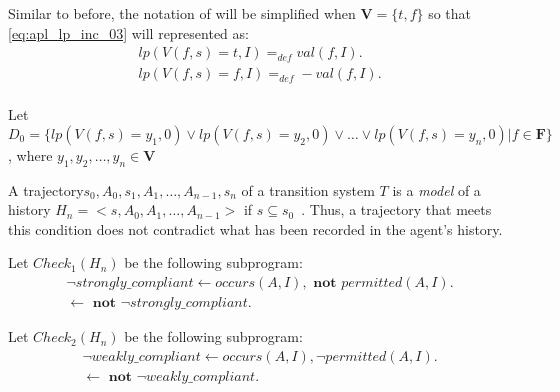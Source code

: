 Similar to before, the notation of \citet{gelfond_authorization_2008} will be simplified when $\boldsymbol{V}=\{t,f\}$ so that \cref{eq:apl_lp_inc_03} will represented as:
\begin{gather}
    lp\left(V(f,s)=t,I\right) =_{def}
        val\left(f,I\right). \\
    lp\left(V(f,s)=f,I\right) =_{def}
        -val\left(f,I\right). \\
\end{gather}

Let $D_0 = \{lp(V(f,s)=y_1, 0) \lor lp(V(f,s)=y_2, 0) \lor \dots \lor lp(V(f,s)=y_n, 0) | f \in \boldsymbol{F}\}$, where $y_1, y_2, \dots, y_n \in \boldsymbol{V}$

\begin{definition}
    \label{def:model_of_history}
    A trajectory\footnotemark $s_0, A_0, s_1, A_1, \dots, A_{n-1}, s_n$ of a transition system $T$ is a \textit{model} of a history $H_n = <s, A_0, A_1, \dots, A_{n-1}>$ if $s \subseteq s_0$~\citep{gelfond_authorization_2008}.
    Thus, a trajectory that meets this condition does not contradict what has been recorded in the agent's history.
\end{definition}

Let $Check_1(H_n)$ be the following subprogram:
\begin{gather}
    \neg strongly\_compliant \leftarrow occurs(A, I), \textbf{ not } permitted(A, I). \\
    \leftarrow \textbf{ not } \neg strongly\_compliant.
\end{gather}

Let $Check_2(H_n)$ be the following subprogram:
\begin{gather}
    \neg weakly\_compliant \leftarrow occurs(A, I), \neg permitted(A, I). \\
    \leftarrow \textbf{ not } \neg weakly\_compliant.
\end{gather}

